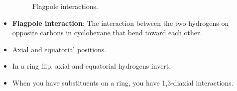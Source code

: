 \documentclass[../notes.tex]{subfiles}
\begin{document}
\begin{itemize}
\begin{itemize}
    \end{itemize}
    \begin{figure}[h!]
        \centering
        \footnotesize
        \caption{Flagpole interactions.}
        \label{fig:flagpoleInteraction}
    \end{figure}
    \item \textbf{Flagpole interaction}: The interaction between the two hydrogens on opposite carbons in cyclohexane that bend toward each other.
    \item Axial and equatorial positions.
    \item In a ring flip, axial and equatorial hydrogens invert.
    \item When you have substituents on a ring, you have 1,3-diaxial interactions.
\end{itemize}
\end{document}
